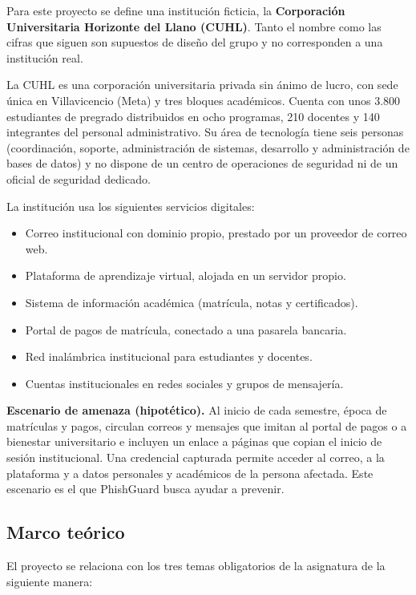 \documentclass[journal,onecolumn,12pt,draftclsnofoot]{IEEEtran}
\begin{document}
Para este proyecto se define una institución ficticia, la \textbf{Corporación Universitaria Horizonte del Llano (CUHL)}. Tanto el nombre como las cifras que siguen son supuestos de diseño del grupo y no corresponden a una institución real.

La CUHL es una corporación universitaria privada sin ánimo de lucro, con sede única en Villavicencio (Meta) y tres bloques académicos. Cuenta con unos 3.800 estudiantes de pregrado distribuidos en ocho programas, 210 docentes y 140 integrantes del personal administrativo. Su área de tecnología tiene seis personas (coordinación, soporte, administración de sistemas, desarrollo y administración de bases de datos) y no dispone de un centro de operaciones de seguridad ni de un oficial de seguridad dedicado.

La institución usa los siguientes servicios digitales:

\begin{itemize}
  \item Correo institucional con dominio propio, prestado por un proveedor de correo web.
  \item Plataforma de aprendizaje virtual, alojada en un servidor propio.
  \item Sistema de información académica (matrícula, notas y certificados).
  \item Portal de pagos de matrícula, conectado a una pasarela bancaria.
  \item Red inalámbrica institucional para estudiantes y docentes.
  \item Cuentas institucionales en redes sociales y grupos de mensajería.
\end{itemize}

\textbf{Escenario de amenaza (hipotético).} Al inicio de cada semestre, época de matrículas y pagos, circulan correos y mensajes que imitan al portal de pagos o a bienestar universitario e incluyen un enlace a páginas que copian el inicio de sesión institucional. Una credencial capturada permite acceder al correo, a la plataforma y a datos personales y académicos de la persona afectada. Este escenario es el que PhishGuard busca ayudar a prevenir.

\subsection{Marco teórico}\label{sec:teorico}

El proyecto se relaciona con los tres temas obligatorios de la asignatura de la siguiente manera:
\end{document}

